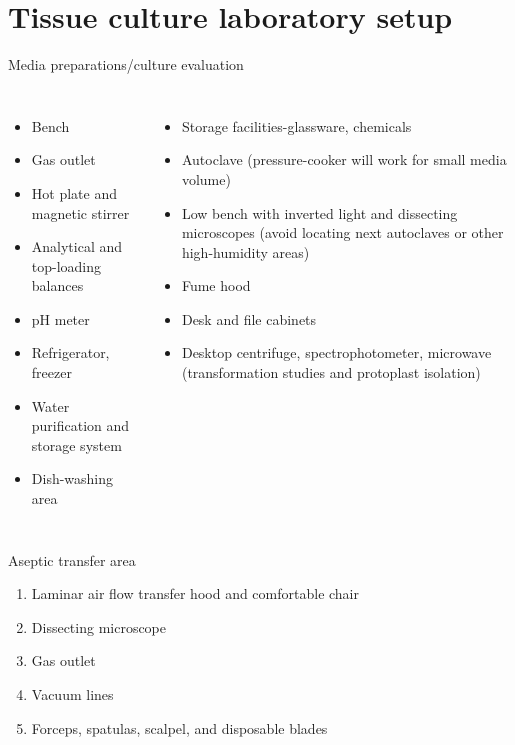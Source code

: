 \documentclass[ignorenonframetext,aspectratio=169]{beamer}
\providecommand{\tightlist}{%
  \setlength{\itemsep}{0pt}\setlength{\parskip}{0pt}}
\begin{document}
\hypertarget{tissue-culture-laboratory-setup}{%
\section{Tissue culture laboratory
setup}\label{tissue-culture-laboratory-setup}}

\begin{frame}{Media preparations/culture evaluation}
\protect\hypertarget{media-preparationsculture-evaluation}{}

\begin{columns}[T,onlytextwidth]
  \begin{itemize}

  \item Bench
  \item Gas outlet
  \item Hot plate and magnetic stirrer
  \item Analytical and top-loading balances
  \item pH meter
  \item Refrigerator, freezer
  \item Water purification and storage system
  \item Dish-washing area
  \end{itemize}

  
  \begin{itemize}

  \item Storage facilities-glassware, chemicals
  \item Autoclave (pressure-cooker will work for small media volume)
  \item Low bench with inverted light and dissecting microscopes (avoid locating next autoclaves or other high-humidity areas)
  \item Fume hood
  \item Desk and file cabinets
  \item Desktop centrifuge, spectrophotometer, microwave (transformation studies and protoplast isolation)

  \end{itemize}

\end{columns}

\end{frame}

\begin{frame}{Aseptic transfer area}
\protect\hypertarget{aseptic-transfer-area}{}

\begin{enumerate}
\tightlist
\item
  Laminar air flow transfer hood and comfortable chair
\item
  Dissecting microscope
\item
  Gas outlet
\item
  Vacuum lines
\item
  Forceps, spatulas, scalpel, and disposable blades
\end{enumerate}

\end{frame}
\end{document}
